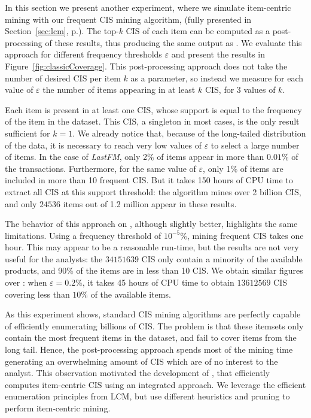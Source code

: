 In this section we present another experiment,
where we simulate item-centric mining with our frequent CIS mining algorithm, \jlcm
(fully presented in Section~\ref{sec:lcm}, p.\pageref{sec:lcm}).
The top-$k$ CIS of each item can be computed as a post-processing of these results,
thus producing the same output as \toppi.
We evaluate this approach for different frequency thresholds $\varepsilon$ and present the results in Figure~\ref{fig:classicCoverage}.
This post-processing approach does not take the number of desired CIS per item $k$ as a parameter,
so instead we measure for each value of $\varepsilon$ the number of items appearing in at least $k$ CIS, for 3 values of $k$.

Each item is present in at least one CIS,
whose support is equal to the frequency of the item in the dataset.
This CIS, a singleton in most cases, is the only result sufficient for $k=1$.
We already notice that, because of the long-tailed distribution of the data,
it is necessary to reach very low values of $\varepsilon$ to select a large number of items.
In the case of {\em LastFM}, only 2\% of items appear in more than $\num{0.01}\%$ of the transactions.
Furthermore, for the same value of $\varepsilon$, only 1\% of items are included in more than 10 frequent CIS.
But it takes 150 hours of CPU time to extract all CIS at this support threshold:
the algorithm mines over 2 billion CIS, and only $\num{24536}$ items out of 1.2 million appear in these results.

The behavior of this approach on \prodassocreceipt, although slightly better, highlights the same limitations.
Using a frequency threshold of $10^{-5}\%$, mining frequent CIS takes one hour.
This may appear to be a reasonable run-time, but the results are not very useful for the analysts:
the $\num{34151639}$ CIS only contain a minority of the available products,
and 90\% of the items are in less than 10 CIS.
We obtain similar figures over \prodassocclient:
when $\varepsilon = 0.2\%$,
it takes 45 hours of CPU time to obtain $\num{13612569}$ CIS covering less than $10\%$ of the available items.

As this experiment shows, standard CIS mining algorithms are perfectly capable of efficiently enumerating billions of CIS.
The problem is that these itemsets only contain the most frequent items in the dataset, and fail to cover items from the long tail.
Hence, the post-processing approach spends most of the mining time generating an overwhelming amount of CIS which are of no interest to the analyst.
This observation motivated the development of \toppi,
that efficiently computes item-centric CIS using an integrated approach.
We leverage the efficient enumeration principles from LCM,
but use different heuristics and pruning to perform item-centric mining.



